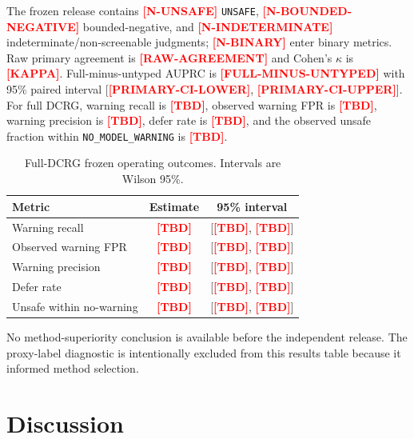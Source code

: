 \documentclass[conference]{IEEEtran}
\newcommand{\code}[1]{\texttt{#1}}
\newcommand{\pending}[1]{\textcolor{red}{\textbf{[#1]}}}
\newif\ifresultsready
\newcommand{\FinalBinaryN}{\pending{N-BINARY}}
\newcommand{\FinalUnsafeN}{\pending{N-UNSAFE}}
\newcommand{\FinalNegativeN}{\pending{N-BOUNDED-NEGATIVE}}
\newcommand{\FinalIndeterminateN}{\pending{N-INDETERMINATE}}
\newcommand{\FinalAgreement}{\pending{RAW-AGREEMENT}}
\newcommand{\FinalKappa}{\pending{KAPPA}}
\newcommand{\PrimaryDelta}{\pending{FULL-MINUS-UNTYPED}}
\newcommand{\PrimaryLower}{\pending{PRIMARY-CI-LOWER}}
\newcommand{\PrimaryUpper}{\pending{PRIMARY-CI-UPPER}}
\newcommand{\FinalDeferRate}{\pending{TBD}}
\newcommand{\FullWarnRecall}{\pending{TBD}}
\newcommand{\FullWarnRecallLower}{\pending{TBD}}
\newcommand{\FullWarnRecallUpper}{\pending{TBD}}
\newcommand{\FullWarnFPR}{\pending{TBD}}
\newcommand{\FullWarnFPRLower}{\pending{TBD}}
\newcommand{\FullWarnFPRUpper}{\pending{TBD}}
\newcommand{\FullWarnPrecision}{\pending{TBD}}
\newcommand{\FullWarnPrecisionLower}{\pending{TBD}}
\newcommand{\FullWarnPrecisionUpper}{\pending{TBD}}
\newcommand{\FullDeferLower}{\pending{TBD}}
\newcommand{\FullDeferUpper}{\pending{TBD}}
\newcommand{\FullNoWarnUnsafeRate}{\pending{TBD}}
\newcommand{\FullNoWarnUnsafeLower}{\pending{TBD}}
\newcommand{\FullNoWarnUnsafeUpper}{\pending{TBD}}
\newcommand{\PaperBranch}{\pending{METHOD-OR-MEASUREMENT}}
\begin{document}
The frozen release contains \FinalUnsafeN{} \code{UNSAFE}, \FinalNegativeN{} bounded-negative,
and \FinalIndeterminateN{} indeterminate/non-screenable judgments; \FinalBinaryN{} enter binary
metrics. Raw primary agreement is \FinalAgreement{} and Cohen's $\kappa$ is \FinalKappa{}.
Full-minus-untyped AUPRC is \PrimaryDelta{} with 95\% paired interval
[\PrimaryLower{}, \PrimaryUpper{}]. For full DCRG, warning recall is \FullWarnRecall{}, observed
warning FPR is \FullWarnFPR{}, warning precision is \FullWarnPrecision{}, defer rate is
\FinalDeferRate{}, and the observed unsafe fraction within \code{NO\_MODEL\_WARNING} is
\FullNoWarnUnsafeRate{}.

\begin{table}[t]
\centering
\caption{Full-DCRG frozen operating outcomes. Intervals are Wilson 95\%.}
\label{tab:operating}
\small
\begin{tabular}{lcc}
\toprule
Metric & Estimate & 95\% interval \\
\midrule
Warning recall & \FullWarnRecall & [\FullWarnRecallLower, \FullWarnRecallUpper] \\
Observed warning FPR & \FullWarnFPR & [\FullWarnFPRLower, \FullWarnFPRUpper] \\
Warning precision & \FullWarnPrecision & [\FullWarnPrecisionLower, \FullWarnPrecisionUpper] \\
Defer rate & \FinalDeferRate & [\FullDeferLower, \FullDeferUpper] \\
Unsafe within no-warning & \FullNoWarnUnsafeRate & [\FullNoWarnUnsafeLower, \FullNoWarnUnsafeUpper] \\
\bottomrule
\end{tabular}
\end{table}

\ifresultsready
\subsection{Primary decision}
The artifact-selected paper branch is \PaperBranch{}. The corresponding claim wording and all
secondary comparisons remain governed by the evidence gates in the submission blueprint.
\else
No method-superiority conclusion is available before the independent release. The proxy-label
diagnostic is intentionally excluded from this results table because it informed method selection.
\fi

\section{Discussion}
\end{document}
